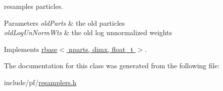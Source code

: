 resamples particles. 


\begin{DoxyParams}{Parameters}
{\em old\+Parts} & the old particles \\
\hline
{\em old\+Log\+Un\+Norm\+Wts} & the old log unnormalized weights \\
\hline
\end{DoxyParams}


Implements \hyperlink{classrbase_aff0f6f88fd4656e67f5ebc870f10dd44}{rbase$<$ nparts, dimx, float\+\_\+t $>$}.



The documentation for this class was generated from the following file\+:\begin{DoxyCompactItemize}
\item 
include/pf/\hyperlink{resamplers_8h}{resamplers.\+h}\end{DoxyCompactItemize}
